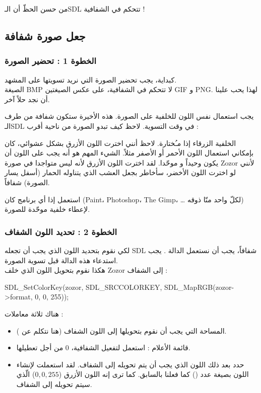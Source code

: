 من حسن الحظّ أن الـ\textenglish{SDL}
تتحكم في الشفافية !

\subsection{جعل صورة شفافة}

\subsubsection{الخطوة 1 : تحضير الصورة}

كبداية، يجب تحضير الصورة التي نريد تسويتها على المشهد.\\
الصيغة 
\textenglish{BMP}
لا تتحكم في الشفافية، على عكس الصيغتين 
\textenglish{GIF}
و 
\textenglish{PNG}.
لهذا يحب علينا أن نجد حلاً آخر. 

يجب استعمال نفس اللون للخلفية على الصورة. هذه الأخيرة ستكون شفافة من طرف الـ\textenglish{SDL}
في وقت التسوية. لاحظ كيف تبدو الصورة
من ناحية أقرب :


الخلفية الزرقاء إذا مـُختارة. لاحظ أنني اخترت اللون الأزرق بشكل عشوائي، كان بإمكاني استعمال اللون الأحمر أو الأصفر مثلاً. الشيء المهم هو أنه يجب على اللون أن يكون وحيداً و موحّدا. لقد اخترت اللون الأزرق لأنه ليس متواجدا في صورة 
\textenglish{Zozor}
لأنني لو اخترت اللون الأخضر، سأخاطر بجعل العشب الذي يتناوله الحمار (أسفل يسار الصورة) شفافاً. 

استعمل إذا أي برنامج كان 
(\textenglish{Paint}، \textenglish{Photoshop}، \textenglish{The Gimp}، \dots
لكلّ واحد منّا ذوقه) لإعطاء خلفية موحّدة للصورة.

\subsubsection{الخطوة 2 : تحديد اللون الشفاف}

لكي نقوم بتحديد اللون الذي يجب أن تجعله
\textenglish{SDL}
شفافاً، يجب أن نستعمل الدالة 
.
يجب استدعاء هذه الدالة قبل تسوية الصورة.\\
هكذا نقوم بتحويل اللون الذي خلف
\textenglish{Zozor}
إلى الشفاف :

\begin{Csource}
SDL_SetColorKey(zozor, SDL_SRCCOLORKEY, SDL_MapRGB(zozor->format, 0, 0, 255));
\end{Csource}

هناك ثلاثة معاملات :

\begin{itemize}
	\item المساحة التي يجب أن نقوم بتحويلها إلى اللون الشفاف (هنا نتكلم عن 
	).
	\item قائمة الأعلام : استعمل 
	لتفعيل الشفافية، 0 من أجل تعطيلها.
	\item حدد بعد ذلك اللون الذي يجب أن يتم تحويله إلى الشفاف. لقد استعملت
	لإنشاء اللون بصيغة عدد
	()
	كما فعلنا بالسابق. كما ترى إنه اللون الأزرق 
	($0, 0, 255$)
	 الّذي سيتم تحويله إلى الشفاف.
	
\end{itemize}

